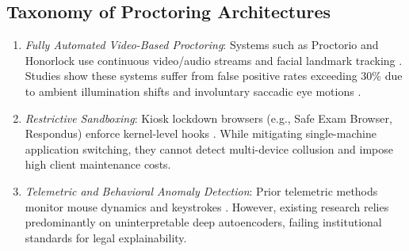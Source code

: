 \documentclass[journal]{IEEEtran}
\begin{document}
\subsection{Taxonomy of Proctoring Architectures}
\begin{enumerate}
    \item \emph{Fully Automated Video-Based Proctoring}: Systems such as Proctorio and Honorlock use continuous video/audio streams and facial landmark tracking \cite{atoum2017}. Studies show these systems suffer from false positive rates exceeding $30\%$ due to ambient illumination shifts and involuntary saccadic eye motions \cite{nigavekar2023}.
    \item \emph{Restrictive Sandboxing}: Kiosk lockdown browsers (e.g., Safe Exam Browser, Respondus) enforce kernel-level hooks \cite{uddin2021}. While mitigating single-machine application switching, they cannot detect multi-device collusion and impose high client maintenance costs.
    \item \emph{Telemetric and Behavioral Anomaly Detection}: Prior telemetric methods monitor mouse dynamics and keystrokes \cite{chen2021, aldmour2023}. However, existing research relies predominantly on uninterpretable deep autoencoders, failing institutional standards for legal explainability.
\end{enumerate}
\end{document}
